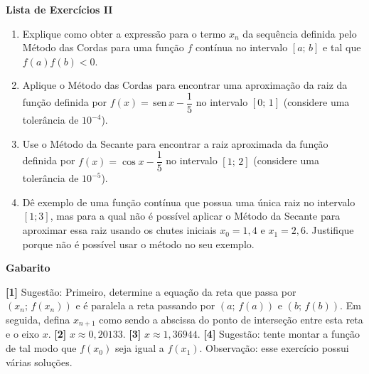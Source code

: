 \documentclass[12pt,a4paper]{article}
\newcommand{\sen}{\,\textrm{sen}\,}
\begin{document}
\begin{center}
 \textbf{Lista de Exercícios II}
\end{center}

\begin{enumerate}

  \item Explique como obter a expressão para o termo $x_n$ da sequência definida pelo Método das Cordas para uma função $f$ contínua no intervalo $[a;\,b]$ e tal que $f(a)f(b)<0$.
  
  \item Aplique o Método das Cordas para encontrar uma aproximação da raiz da função definida por $f(x) = \sen x - \dfrac{1}{5}$ no intervalo $[0;\,1]$ (considere uma tolerância de $10^{-4}$).

  \item Use o Método da Secante para encontrar a raiz aproximada da função definida por $f(x) = \cos x - \dfrac{1}{5}$ no intervalo $[1;\,2]$ (considere uma tolerância de $10^{-5}$).
  
  \item Dê exemplo de uma função contínua que possua uma única raiz no intervalo $[1; 3]$, mas para a qual não é possível aplicar o Método da Secante para aproximar essa raiz usando os chutes iniciais 
$x_0 = 1,4$ e $x_1 = 2,6$. Justifique porque não é possível usar o método no seu exemplo.
\end{enumerate}

\begin{center}
\textbf{Gabarito}
\end{center}
\textbf{[1]} Sugestão: Primeiro, determine a equação da reta que passa por $(x_n;\,f(x_n))$ e é paralela a reta passando por $(a;\,f(a))$ e $(b;\,f(b))$. Em seguida, 
defina $x_{n+1}$ como sendo a abscissa do ponto de interseção entre esta reta e o eixo $x$. 
\textbf{[2]} $x\approx 0,20133$. 
\textbf{[3]} $x\approx 1,36944$. 
\textbf{[4]} Sugestão: tente montar a função de tal modo que $f(x_0)$ seja igual a $f(x_1)$. Observação: esse exercício possui várias soluções.
\end{document}
